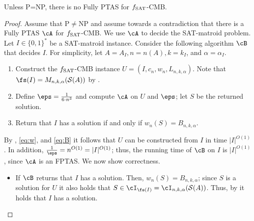 \begin{lemma}
	\label{lem:CMB-NP}
	Unless \textnormal{P=NP}, there is no \textnormal{Fully PTAS} for $f_{\textnormal{SAT}}$-\textnormal{CMB}. 
\end{lemma}
	\begin{proof}
		Assume that P$\neq$NP and assume towards a contradiction that there is a Fully PTAS $\cA$ for $f_{\textnormal{SAT}}$-CMB. We use $\cA$ to decide the SAT-matroid problem.  Let $I \in \{0,1\}^*$ be a SAT-matroid instance. Consider the following algorithm $\cB$ that decides $I$. For simplicity, let $A = A_I, n = n(A), k = k_I$, and $\alpha = \alpha_I$. 
	\begin{enumerate}
		\item Construct the $f_{\textnormal{SAT}}$-CMB instance $%
		U= (I,c_n,w_{n},L_{n,k,\alpha})$. Note that $\fs (I) = M_{n,k,\alpha}(\mathcal{S}(A))$ by .  %
		\item Define $\eps = \frac{1}{6 \cdot n^3}$ and compute $\cA$ on $U$ and $\eps$; let $S$ be the returned solution.  
		\item Return that $I$ has a solution if and only if $w_n(S) = B_{n,k,\alpha}$. 
	\end{enumerate}
By , \eqref{eq:w}, and \eqref{eq:B} it follows that $U$ can be constructed from $I$ in time $|I|^{O(1)}$.   In addition, %
$\frac{1}{\eps} =n^{O(1)} = |I|^{O(1)}$; thus, the running time of $\cB$ on $I$ is $|I|^{O(1)}$, since $\cA$ is an FPTAS. We now show correctness.
	\begin{itemize}
		\item If $\cB$ returns that $I$ has a solution. Then, $w_n(S) = B_{n,k,\alpha}$; since $S$ is a solution for $U$ it also holds that $S \in \cI_{\fs (I)} = \cI_{n,k,\alpha}(\mathcal{S}(A))$. Thus, by  it holds that $I$ has a solution.  

\end{itemize}
\end{proof}
